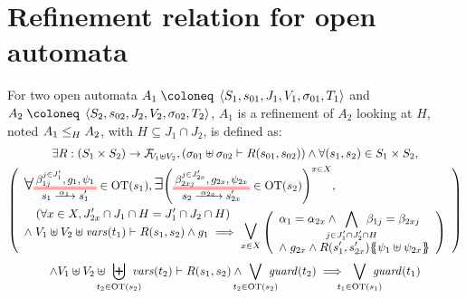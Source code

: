 \documentclass{article}
\begin{document}
\section{Refinement relation for open automata}\label{sec:refinement}
\begin{defi}
For two open automata \(A_1 \defobject \OA{S_1}{s_{01}}{J_1}{V_1}{\sigma_{01}}{T_1}\) and \(A_2 \defobject \OA{S_2}{s_{02}}{J_2}{V_2}{\sigma_{02}}{T_2}\), \(A_1\) is a refinement of \(A_2\) looking at \(H\), noted \(\wrel{A_1}{A_2}{H}\), with \(H \subseteq J_1 \cap J_2\), is defined as:
\begin{multline*}
	\exists R: \mpar{S_1 \times S_2} \to \rformulas[V_1 \uplus V_2], \mpar{\sigma_{01} \uplus \sigma_{02} \vdash R\mpar{s_{01}, s_{02}}} \wedge \forall \mpar{s_1, s_2} \in S_1 \times S_2, \\
	\mpar{\everymath{\displaystyle}\begin{array}{l}
		\bigsymb{\forall} \OTx{1}{}{1}{1} \in \fOT{s_1}, \bigsymb{\exists} \mpar{\OTx{2}{x}{2x}{2x} \in \fOT{s_2}}^{x \in X}, \\[12pt]
		\quad \mpar{\forall x \in X, J'_{2x} \cap J_1 \cap H = J'_1 \cap J_2 \cap H} \\[-10pt]
		\nwedge V_1 \uplus V_2 \uplus \fvars{t_1} \vdash R\mpar{s_1, s_2} \wedge g_1 \implies \operatorname*{\bigsymb{\bigvee}}_{x \in X} \mpar{\begin{array}{l}
			\alpha_1 = \alpha_{2x} \wedge \bigwedge_\subbox{j \in J'_1 \cap J'_2 \cap H} \beta_{1j} = \beta_{2xj} \\
			\nwedge g_{2x} \wedge R\mpar{s'_1, s'_{2x}}\psubst{\psi_1 \uplus \psi_{2x}}
		\end{array}} \\
	\end{array}} \\
	\wedge V_1 \uplus V_2 \uplus \biguplus_\subbox{t_2 \in \fOT{s_2}} \fvars{t_2} \vdash R\mpar{s_1, s_2} \wedge \bigvee_\subbox{t_2 \in \fOT{s_2}} \fguard{t_2} \implies \bigvee_\subbox{t_1 \in \fOT{s_1}} \fguard{t_1}
\end{multline*}
\end{defi}
\end{document}
